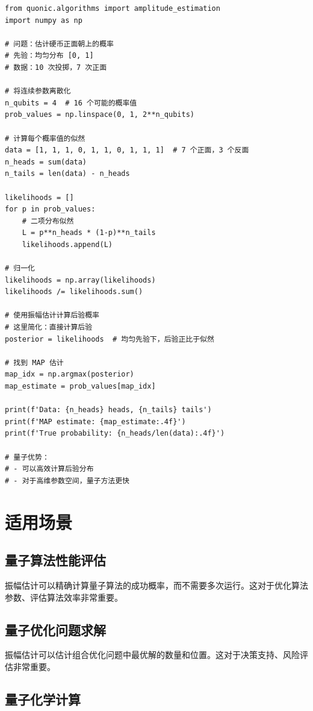 \documentclass[12pt,a4paper]{article}
\begin{document}
\begin{verbatim}
from quonic.algorithms import amplitude_estimation
import numpy as np

# 问题：估计硬币正面朝上的概率
# 先验：均匀分布 [0, 1]
# 数据：10 次投掷，7 次正面

# 将连续参数离散化
n_qubits = 4  # 16 个可能的概率值
prob_values = np.linspace(0, 1, 2**n_qubits)

# 计算每个概率值的似然
data = [1, 1, 1, 0, 1, 1, 0, 1, 1, 1]  # 7 个正面，3 个反面
n_heads = sum(data)
n_tails = len(data) - n_heads

likelihoods = []
for p in prob_values:
    # 二项分布似然
    L = p**n_heads * (1-p)**n_tails
    likelihoods.append(L)

# 归一化
likelihoods = np.array(likelihoods)
likelihoods /= likelihoods.sum()

# 使用振幅估计计算后验概率
# 这里简化：直接计算后验
posterior = likelihoods  # 均匀先验下，后验正比于似然

# 找到 MAP 估计
map_idx = np.argmax(posterior)
map_estimate = prob_values[map_idx]

print(f'Data: {n_heads} heads, {n_tails} tails')
print(f'MAP estimate: {map_estimate:.4f}')
print(f'True probability: {n_heads/len(data):.4f}')

# 量子优势：
# - 可以高效计算后验分布
# - 对于高维参数空间，量子方法更快
\end{verbatim}

\section{适用场景}

\subsection{量子算法性能评估}

振幅估计可以精确计算量子算法的成功概率，而不需要多次运行。这对于优化算法参数、评估算法效率非常重要。

\subsection{量子优化问题求解}

振幅估计可以估计组合优化问题中最优解的数量和位置。这对于决策支持、风险评估非常重要。

\subsection{量子化学计算}
\end{document}
